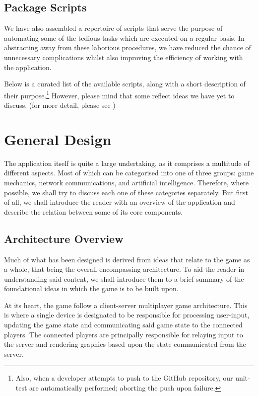 \documentclass{standalone}
\begin{document}
		\subsection{Package Scripts}
			We have also assembled a repertoire of scripts that serve the purpose of automating some of the tedious tasks which are executed on a regular basis. In abstracting away from these laborious procedures, we have reduced the chance of unnecessary complications whilst also improving the efficiency of working with the application.

			Below is a curated list of the available scripts, along with a short description of their purpose.\footnote{Also, when a developer attempts to push to the GitHub repository, our unit-test are automatically performed; aborting the push upon failure.} However, please mind that some reflect ideas we have yet to discuss. (for more detail, please see )
			\begin{formal}
				
			\end{formal}

	\section{General Design}
		The application itself is quite a large undertaking, as it comprises a multitude of different aspects. Most of which can be categorised into one of three groups: game mechanics, network communications, and artificial intelligence. Therefore, where possible, we shall try to discuss each one of these categories separately. But first of all, we shall introduce the reader with an overview of the application and describe the relation between some of its core components.

		\subsection{Architecture Overview}
			Much of what has been designed is derived from ideas that relate to the game as a whole, that being the overall encompassing architecture. To aid the reader in understanding said content, we shall introduce them to a brief summary of the foundational ideas in which the game is to be built upon.

			At its heart, the game follow a client-server multiplayer game architecture. This is where a single device is designated to be responsible for processing user-input, updating the game state and communicating said game state to the connected players. The connected players are principally responsible for relaying input to the server and rendering graphics based upon the state communicated from the server.
\end{document}
